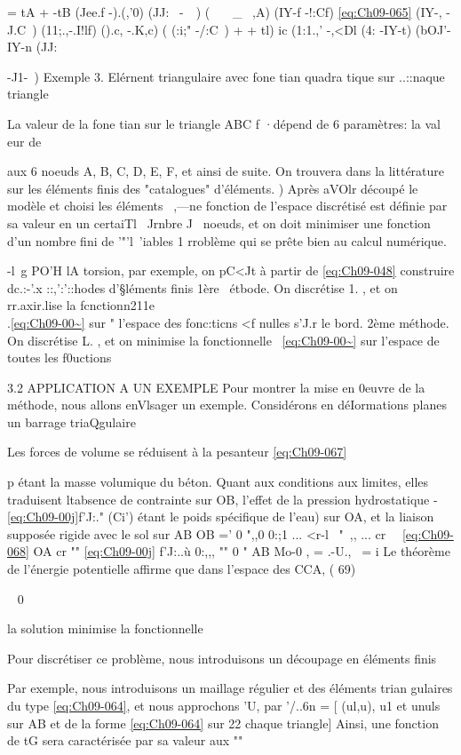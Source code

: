 { = tA + -tB
(Jee.f -).(,'0) (JJ:~ -~~) (~~~ _ ~,A) (IY-f -!:Cf) 
\eqref{eq:Ch09-065} 
(IY-, -J.C~) (11;.,-.I!lf) ().c, -.K,c) ( (:i;" -/:C~)
+ + tl)
ic (1:1.,' -,<Dl (4: -IY-t) (bOJ'-IY-n (JJ:{-J1-~) 
Exemple 3. Elérnent triangulaire avec fone tian quadra tique sur ..::naque trian­gle 

La valeur de la fone tian sur le triangle ABC
f 
·dépend de 6 paramètres: la val eur de { aux 6 
noeuds A, B, C, D, E, F, et ainsi de suite. On 
trouvera dans la littérature sur les éléments 
finis des "catalogues" d'éléments. 
) 
Après aVOlr découpé le modèle et choisi les éléments~ ,---ne fonction de l'espace discrétisé est définie par sa valeur en un certaiTl ~Jrnbre J~ noeuds, et on doit minimiser une fonction d'un nombre fini de '"'l~'iables 1 rro­blème qui se prête bien au calcul numérique. 

-l~g 
PO'H lA torsion, par exemple, on pC<Jt à partir de \eqref{eq:Ch09-048} construire dc.:-'.x ::,':'::hodes d'§léments finis 1ère ~étbode. On discrétise 1. , et on rr.axir.lise la fcnctionn211e \\.\eqref{eq:Ch09-00~} sur 
"
l'espace des fonc:ticns <f nulles s'J.r le bord. 
2ème méthode. On discrétise L. , et on minimise la fonctionnelle ~\eqref{eq:Ch09-00~} sur 
l'espace de toutes les f0uctions ~ 

3.2 APPLICATION A UN EXEMPLE 
Pour montrer la mise en 0euvre de la méthode, nous allons enVlsa­ger un exemple. Considérons en déIormations planes un barrage triaQgulaire 

Les forces de volume se réduisent à la pesanteur 
\eqref{eq:Ch09-067} 

p étant la masse volumique du béton. Quant aux conditions aux limites, elles traduisent ltabsence de contrainte sur OB, l'effet de la pression hydrostatique -\eqref{eq:Ch09-00j}f'J:." (Ci') étant le poids spé­cifique de l'eau) sur OA, et la liaison supposée rigide avec le sol sur AB 
OB =' 0 ",,0
0:;1 ... <r-l~ "~,, ... cr~~ 
\eqref{eq:Ch09-068} OA cr "" \eqref{eq:Ch09-00j} f'J:..ù 0:,,, "" 0
" 
AB Mo-0
, = .-U.,~ =
i 
Le théorème de l'énergie potentielle affirme que dans l'espace des CCA, 
( 69) 

~ 0 

la solution minimise la fonctionnelle 

Pour discrétiser ce problème, nous introduisons un découpage en éléments finis 

Par exemple, nous introduisons un maillage régulier et des éléments trian
gulaires du type \eqref{eq:Ch09-064}, et nous approchons 'U, par '/..6n = [ (ul,u), u1 et unuls sur AB et de la forme \eqref{eq:Ch09-064} sur
22 chaque triangle] 
Ainsi, une fonction de tG sera caractérisée par sa valeur aux 
"" 

}}}
